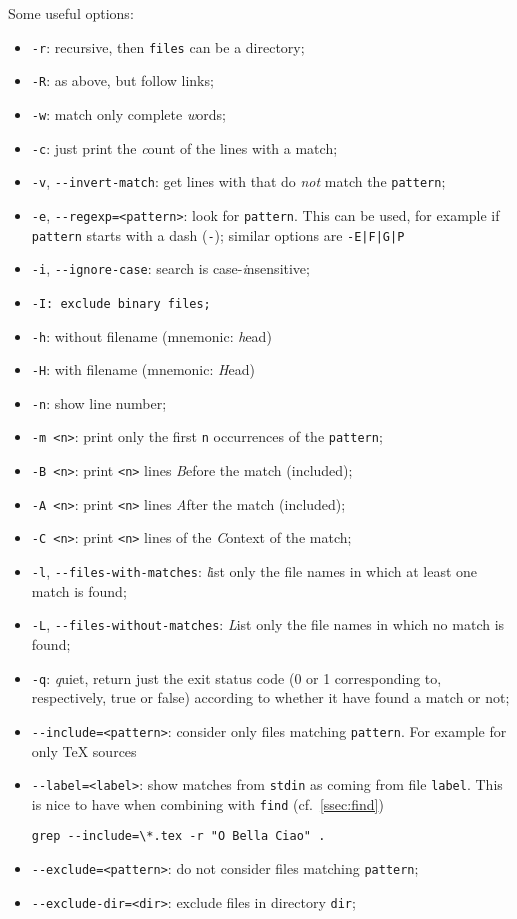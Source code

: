 \documentclass[a4paper,12pt,%
              final%
              ]{article}
\begin{document}
Some useful options:
\begin{itemize}
  \item \texttt{-r}: recursive, then \texttt{files} can be a directory;
  \item \texttt{-R}: as above, but follow links;
  \item \texttt{-w}: match only complete \emph{w}ords;
  \item \texttt{-c}: just print the \emph{c}ount of the lines with a match;
  \item \texttt{-v}, \verb|--invert-match|: get lines with that do \emph{not} match the \texttt{pattern};
  \item \texttt{-e}, \verb|--regexp=<pattern>|: look for \texttt{pattern}. This can be used, for example if \texttt{pattern} starts with a dash (\texttt{-}); similar options are \verb!-E|F|G|P!
  \item \texttt{-i}, \verb|--ignore-case|: search is case-\emph{i}nsensitive;
  \item \texttt{-I: exclude binary files;}
  \item \texttt{-h}: without filename (mnemonic: \emph{h}ead)
  \item \texttt{-H}: with filename (mnemonic: \emph{H}ead)
  \item \texttt{-n}: show line number;
  \item \texttt{-m <n>}: print only the first \texttt{n} occurrences of the \texttt{pattern};
  \item \texttt{-B <n>}: print \texttt{<n>} lines \emph{B}efore the match (included);
  \item \texttt{-A <n>}: print \texttt{<n>} lines \emph{A}fter the match (included);
  \item \texttt{-C <n>}: print \texttt{<n>} lines of the \emph{C}ontext of the match;
  \item \texttt{-l}, \verb|--files-with-matches|: \emph{l}ist only the file names in which at least one match is found;
  \item \texttt{-L}, \verb|--files-without-matches|: \emph{L}ist only the file names in which no match is found;
  \item \texttt{-q}: \emph{q}uiet, return just the exit status code (0 or 1 corresponding to, respectively, true or false) according to whether it have found a match or not;
  \item \verb|--include=<pattern>|: consider only files matching \texttt{pattern}. For example for only \TeX{} sources
  \item \verb|--label=<label>|: show matches from \texttt{stdin} as coming from file \texttt{label}. This is nice to have when combining with \texttt{find} (cf.\ \autoref{ssec:find})
\begin{verbatim}
grep --include=\*.tex -r "O Bella Ciao" .
\end{verbatim}
  \item \verb|--exclude=<pattern>|: do not consider files matching \texttt{pattern};
  \item \verb|--exclude-dir=<dir>|: exclude files in directory \texttt{dir};
\end{itemize}
\end{document}
